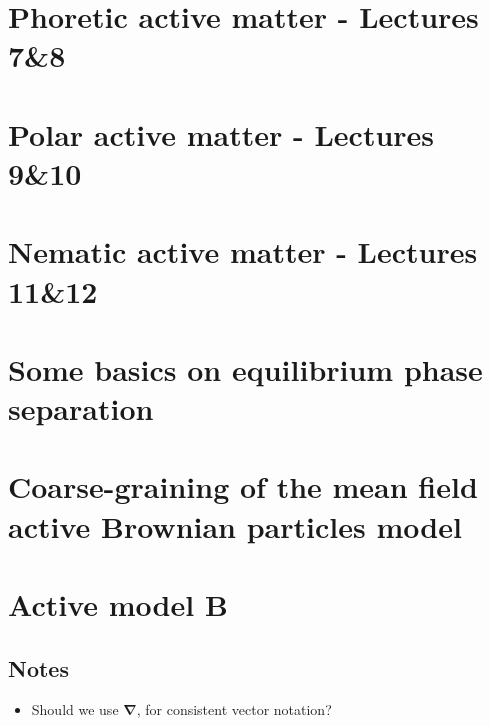 \documentclass[10pt, a4paper, oneside]{book}
\begin{document}
    \chapter{Phoretic active matter - Lectures 7\&8}
    \label{chap_phoretic}

    \chapter{Polar active matter  - Lectures 9\&10}
    \label{chap_polar}
    

    \chapter{Nematic active matter  - Lectures 11\&12}
    \label{chap_nematic}

    \appendix

    \chapter{Some basics on equilibrium phase separation}
    

    \chapter{Coarse-graining of the mean field active Brownian particles model}
    

    \chapter{Active model B}
    

    
    

    
    \setcounter{tocdepth}{1}
    \listoftodos
    
    \section*{Notes}
    \begin{itemize}
        \item Should we use $\bm \nabla$, for consistent vector notation?
    \end{itemize}
\end{document}
